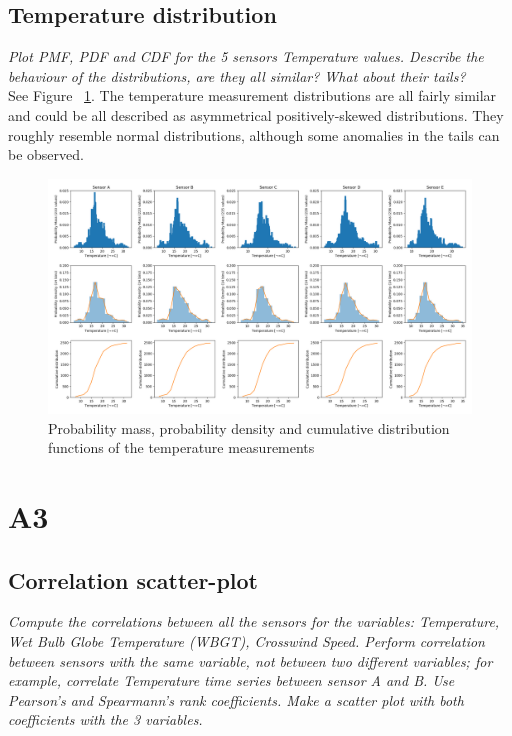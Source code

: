 \documentclass{article}
\begin{document}
\subsection{Temperature distribution}
\textit{
Plot PMF, PDF and CDF for the 5 sensors Temperature values. Describe the behaviour of the distributions, are they all similar?
What about their tails?
}\\

See Figure ~\ref{fig:2-1}. The temperature measurement distributions are all fairly similar and could be all described as asymmetrical positively-skewed distributions. They roughly resemble normal distributions, although some anomalies in the tails can be observed.

\begin{figure}[!htb]
\centering
\includegraphics[width=\textwidth]{2-1-14_bins.png}
\caption{Probability mass, probability density and cumulative distribution functions of the temperature measurements}
\label{fig:2-1}
\end{figure}


\newpage

\section{A3}

\subsection{Correlation scatter-plot}
\textit{
Compute the correlations between all the sensors for the variables: Temperature, Wet Bulb Globe Temperature (WBGT), Crosswind Speed. Perform correlation between sensors with the same variable, not between two different variables; for example, correlate Temperature time series between sensor A and B. Use Pearson’s and Spearmann’s rank coefficients. Make a scatter plot with both coefficients with the 3 variables.
}\\
\end{document}
